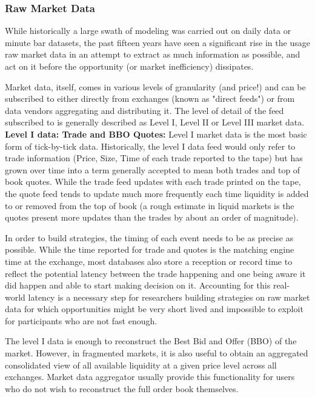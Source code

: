 \subsubsection{Raw Market Data}

While historically a large swath of modeling was carried out on daily data or minute bar datasets, the past fifteen years have seen a significant rise in the usage raw market data in an attempt to extract as much information as possible, and act on it before the opportunity (or market inefficiency) dissipates.

Market data, itself, comes in various levels of granularity (and price!) and can be subscribed to either directly from exchanges (known as "direct feeds") or from data vendors aggregating and distributing it. The level of detail of the feed subscribed to is generally described as Level I, Level II or Level III market data.\\

\noindent\textbf{Level I data: Trade and BBO Quotes:} Level I market data is the most basic form of tick-by-tick data. Historically, the level I data feed would only refer to trade information (Price, Size, Time of each trade reported to the tape) but has grown over time into a term generally accepted to mean both trades and top of book quotes. While the trade feed updates with each trade printed on the tape, the quote feed tends to update much more frequently each time liquidity is added to or removed from the top of book (a rough estimate in liquid markets is the quotes present more updates than the trades by about an order of magnitude). 

In order to build strategies, the timing of each event needs to be as precise as possible. While the time reported for trade and quotes is the matching engine time at the exchange, most databases also store a reception or record time to reflect the potential latency between the trade happening and one being aware it did happen and able to start making decision on it. Accounting for this real-world latency is a necessary step for researchers building strategies on raw market data for which opportunities might be very short lived and impossible to exploit for participants who are not fast enough.

The level I data is enough to reconstruct the Best Bid and Offer (BBO) of the market. However, in fragmented markets, it is also useful to obtain an aggregated consolidated view of all available liquidity at a given price level across all exchanges. Market data aggregator usually provide this functionality for users who do not wish to reconstruct the full order book themselves. 

